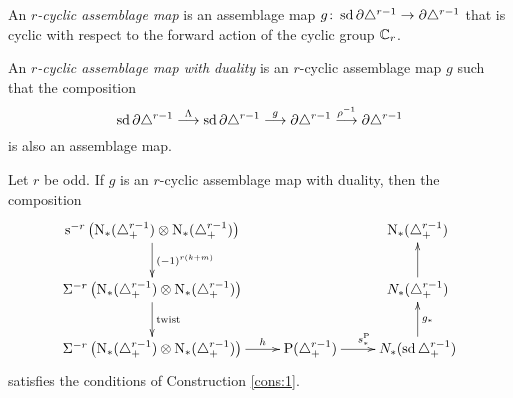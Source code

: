 \begin{definition}
	An \emph{$r$-cyclic assemblage map} is an assemblage map $g\colon \operatorname{sd} \partial \triangle^{r-1}\to \partial \triangle^{r-1}$ that is cyclic with respect to the forward action of the cyclic group $\mathbb{C}_{r}$.
\end{definition}

\begin{definition}
	An \emph{$r$-cyclic assemblage map with duality} is an $r$-cyclic assemblage map $g$ such that the composition
	\[\operatorname{sd} \partial \triangle^{r-1} \overset{\Lambda}{\longrightarrow} \operatorname{sd} \partial\triangle^{r-1} \overset{g}{\longrightarrow} \partial\triangle^{r-1}\overset{\rho^{-1}}{\longrightarrow} \partial\triangle^{r-1} \]
	is also an assemblage map.
\end{definition}

\begin{proposition}\label{prop:assemblage}
	Let $r$ be odd. If $g$ is an $r$-cyclic assemblage map with duality, then the composition
	\[\xymatrix{
		\sus{-r}\left(\chains(\asimplex^{r-1})\otimes \chains(\asimplex^{r-1})\right)\ar[d]^{(-1)^{r(k+m)}}&&
		\chains(\asimplex^{r-1})
		\\
		\susp{-r}\left(\chains(\asimplex^{r-1})\otimes \chains(\asimplex^{r-1})\right)\ar[d]^-{\twist} &&
		\cadenas(\asimplex^{r-1})\ar[u]
		\\
		\susp{-r}\left(\chains(\asimplex^{r-1})\otimes \chains(\asimplex^{r-1})\right)\ar[r]^-{h} &
		\Psd(\asimplex^{r-1}) \ar[r]^{s_*^{\Psd}} &
		\cadenas(\sd\asimplex^{r-1})\ar[u]_{g_*}
	}
	\]
	satisfies the conditions of Construction \ref{cons:1}.
\end{proposition}

